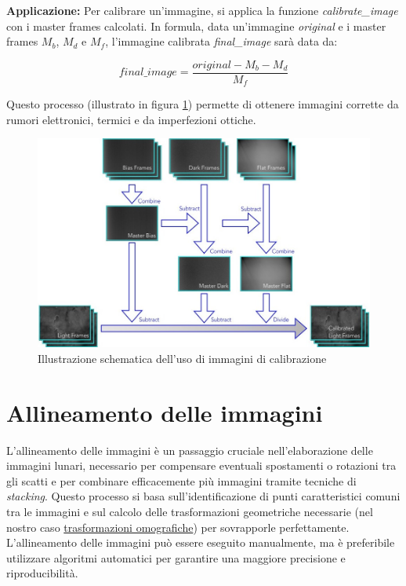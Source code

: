 \textbf{Applicazione:} Per calibrare un'immagine, si applica la funzione \textit{calibrate\_image} con i master frames calcolati. In formula, data un'immagine \textit{original} e i master frames $M_b$, $M_d$ e $M_f$, l'immagine calibrata \textit{final\_image} sarà data da:

$$
    final\_image = \dfrac {original - M_b - M_d} {M_f}
$$

Questo processo (illustrato in figura \ref{fig:calibration})  permette di ottenere immagini corrette da rumori elettronici, termici e da imperfezioni ottiche.

\begin{figure} [H]
    \centering
    \includegraphics[scale = 0.45]{../assets/calibration_procedure.jpg}
    \captionsetup{justification=centering}
    \caption{Illustrazione schematica dell'uso di immagini di calibrazione \cite{calibration_img}} \label{fig:calibration}
\end{figure}

\section{Allineamento delle immagini} \label{sec:alignment}

L'allineamento delle immagini è un passaggio cruciale nell'elaborazione delle immagini lunari, necessario per compensare eventuali spostamenti o rotazioni tra gli scatti e per combinare efficacemente più immagini tramite tecniche di \textit{stacking}. Questo processo si basa sull'identificazione di punti caratteristici comuni tra le immagini e sul calcolo delle trasformazioni geometriche necessarie (nel nostro caso \hyperref[subsec:homography]{trasformazioni omografiche}) per sovrapporle perfettamente. L'allineamento delle immagini può essere eseguito manualmente, ma è preferibile utilizzare algoritmi automatici per garantire una maggiore precisione e riproducibilità.

